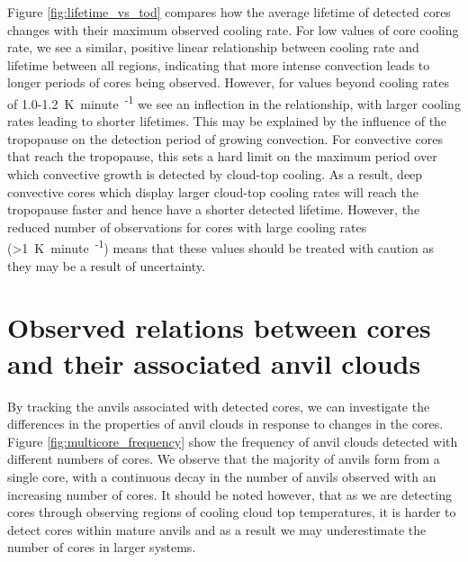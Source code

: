 Figure \ref{fig:lifetime_vs_tod} compares how the average lifetime of detected cores changes with their maximum observed cooling rate.
For low values of core cooling rate, we see a similar, positive linear relationship between cooling rate and lifetime between all regions, indicating that more intense convection leads to longer periods of cores being observed.
However, for values beyond cooling rates of 1.0-1.2~\unit{K minute\textsuperscript{-1}} we see an inflection in the relationship, with larger cooling rates leading to shorter lifetimes.
This may be explained by the influence of the tropopause on the detection period of growing convection.
For convective cores that reach the tropopause, this sets a hard limit on the maximum period over which convective growth is detected by cloud-top cooling.
As a result, deep convective cores which display larger cloud-top cooling rates will reach the tropopause faster and hence have a shorter detected lifetime.
However, the reduced number of observations for cores with large cooling rates (>1~\unit{K minute\textsuperscript{-1}}) means that these values should be treated with caution as they may be a result of uncertainty.



\section{Observed relations between cores and their associated anvil clouds}

By tracking the anvils associated with detected cores, we can investigate the differences in the properties of anvil clouds in response to changes in the cores.
Figure \ref{fig:multicore_frequency} show the frequency of anvil clouds detected with different numbers of cores.
We observe that the majority of anvils form from a single core, with a continuous decay in the number of anvils observed with an increasing number of cores.
It should be noted however, that as we are detecting cores through observing regions of cooling cloud top temperatures, it is harder to detect cores within mature anvils and as a result we may underestimate the number of cores in larger systems.

